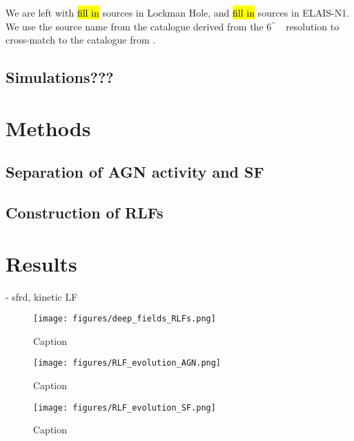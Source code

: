 \documentclass[usenatbib,fleqn,letters]{mnras}
\newcommand{\sarc}{$^{\prime\prime}\!\!$}
\begin{document}
We are left with \hl{fill in} sources in Lockman Hole, and \hl{fill in} sources in ELAIS-N1. We use the source name from the catalogue derived from the 6\sarc\ \ resolution to cross-match to the catalogue from \cite{best_lofar_2023}. 

\subsection{Simulations???}

\section{Methods}

\subsection{Separation of AGN activity and SF}

\subsection{Construction of RLFs}

\section{Results}



- sfrd, kinetic LF


\begin{figure*}
    \centering
    \texttt{[image: figures/deep\_fields\_RLFs.png]}
    \caption{Caption}
    \label{fig:msrlfs}
\end{figure*}

\begin{figure}
    \centering
    \texttt{[image: figures/RLF\_evolution\_AGN.png]}
    \caption{Caption}
    \label{fig:agn_evolution}
\end{figure}

\begin{figure}
    \centering
    \texttt{[image: figures/RLF\_evolution\_SF.png]}
    \caption{Caption}
    \label{fig:sf_evolution}
\end{figure}
\end{document}

